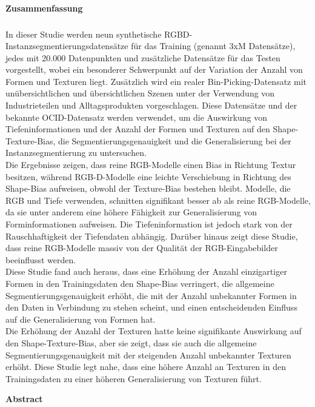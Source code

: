 \cleardoublepage

\thispagestyle{empty}
\textsf{\large\textbf{Zusammenfassung}}
\subsubsection*{\hsmatitelde}%
In dieser Studie werden neun synthetische RGBD-Instanzsegmentierungsdatensätze für das Training (genannt 3xM Datensätze), jedes mit 20.000 Datenpunkten und zusätzliche Datensätze für das Testen vorgestellt, wobei ein besonderer Schwerpunkt auf der Variation der Anzahl von Formen und Texturen liegt. Zusätzlich wird ein realer Bin-Picking-Datensatz mit unübersichtlichen und übersichtlichen Szenen unter der Verwendung von Industrieteilen und Alltagsprodukten vorgeschlagen. Diese Datensätze und der bekannte OCID-Datensatz werden verwendet, um die Auswirkung von Tiefeninformationen und der Anzahl der Formen und Texturen auf den Shape-Texture-Bias, die Segmentierungsgenauigkeit und die Generalisierung bei der Instanzsegmentierung zu untersuchen.\\
Die Ergebnisse zeigen, dass reine RGB-Modelle einen Bias in Richtung Textur besitzen, während RGB-D-Modelle eine leichte Verschiebung in Richtung des Shape-Bias aufweisen, obwohl der Texture-Bias bestehen bleibt. Modelle, die RGB und Tiefe verwenden, schnitten signifikant besser ab als reine RGB-Modelle, da sie unter anderem eine höhere Fähigkeit zur Generalisierung von Forminformationen aufweisen.  Die Tiefeninformation ist jedoch stark von der Rauschhaftigkeit der Tiefendaten abhängig. Darüber hinaus zeigt diese Studie, dass reine RGB-Modelle massiv von der Qualität der RGB-Eingabebilder beeinflusst werden.\\
Diese Studie fand auch heraus, dass eine Erhöhung der Anzahl einzigartiger Formen in den Trainingsdaten den Shape-Bias verringert, die allgemeine Segmentierungsgenauigkeit erhöht, die mit der Anzahl unbekannter Formen in den Daten in Verbindung zu stehen scheint, und einen entscheidenden Einfluss auf die Generalisierung von Formen hat. \\
Die Erhöhung der Anzahl der Texturen hatte keine signifikante Auswirkung auf den Shape-Texture-Bias, aber sie zeigt, dass sie auch die allgemeine Segmentierungsgenauigkeit mit der steigenden Anzahl unbekannter Texturen erhöht. Diese Studie legt nahe, dass eine höhere Anzahl an Texturen in den Trainingsdaten zu einer höheren Generalisierung von Texturen führt.

\clearpage
\thispagestyle{empty}
\textsf{\large\textbf{Abstract}}
